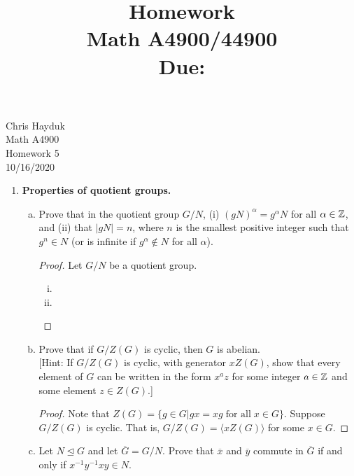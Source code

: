 \documentclass[11pt, reqno]{amsart}
\title[Homework \HW]{Homework \HW \\
Math A4900/44900\\
\small Due: \DUE}
\author{}
\theoremstyle{plain}
\theoremstyle{definition}
\theoremstyle{example}
\def\normeq{\unlhd}
\def\HW{5}
\def\DUE{10/16/2020}
\begin{document}
\begin{flushright}
Chris Hayduk\\
Math A4900\\
Homework \HW\\
\DUE
\end{flushright}





\begin{enumerate}[1.]
\item  {\bf Properties of quotient groups.}
\begin{enumerate}[(a)]
\item Prove that in the quotient group $G/N$, (i) $(gN)^\alpha = g^\alpha N$ for all $\alpha \in \mathbb{Z}$, and (ii) that $|gN| = n$, where $n$ is the smallest positive integer such that $g^n \in N$ (or is infinite if $g^\alpha \notin N$ for all $\alpha$).

\begin{proof} Let $G/N$ be a quotient group.
\begin{enumerate}[(i)]

\item 

\item

\end{enumerate}
\end{proof}

\item Prove that if $G/Z(G)$ is cyclic, then $G$ is abelian. \\
	{\small [Hint: If $G/Z(G)$ is cyclic, with generator $x Z(G)$, show that every element of $G$ can be written in the form $x^a z$ for some integer $a \in \mathbb{Z}$ and some element $z \in Z(G)$.]}
	
\begin{proof}
Note that $Z(G) = \{g \in G | gx = xg \; \text{for all} \; x \in G\}$. Suppose $G/Z(G)$ is cyclic. That is, $G/Z(G) = \langle xZ(G) \rangle$ for some $x \in G$.
\end{proof}

\item Let $N \normeq G$ and let $\overline{G} = G/N$. Prove that $\overline{x}$ and $\overline{y}$ commute in $\overline{G}$ if and only if $x^{-1} y^{-1} xy \in N$. 


\end{enumerate}
\end{enumerate}
\end{document}
